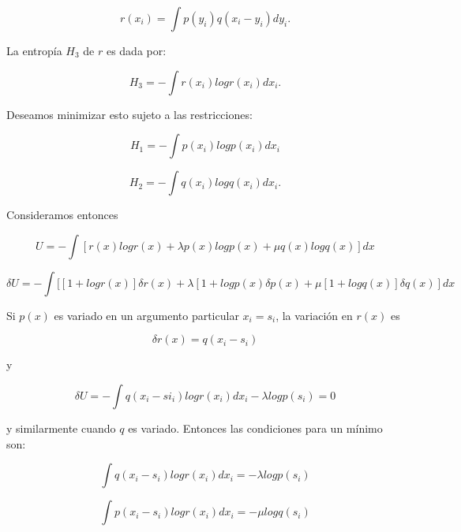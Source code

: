 \begin{equation} r(x_{i}) = \int p(y_{i}) q(x_{i} - y_{i}) dy_{i}.\end{equation}
			
La entrop\'ia $H_{3}$ de $r$ es dada por:

\begin{equation} H_{3} = - \int r(x_{i}) logr(x_{i}) dx_{i}. \end{equation}
			
Deseamos minimizar esto sujeto a las restricciones:

\begin{equation} H_{1} = - \int p(x_{i}) log p(x_{i}) dx_{i} \end{equation}
			
\begin{equation} H_{2} = - \int q(x_{i}) log q(x_{i}) dx_{i}. \end{equation}
				
Consideramos entonces
			
\begin{equation} U = - \int [r(x) logr(x) + \lambda p(x) log p(x) + \mu q(x) log q(x)]dx \end{equation}

\begin{equation} \delta U =  - \int  [[1 + logr(x)] \delta r(x) + \lambda [1 + logp(x) \delta p(x) + 
\mu [1 + logq(x)]\delta q(x)]dx \end{equation}

Si $p(x)$ es variado en un argumento particular $x_{i} = s_{i}$, la variaci\'on en $r(x)$ es

\begin{equation} \delta r(x) = q(x_{i} - s_{i}) \end{equation}
					
y

\begin{equation} \delta U = - \int q (x_{i} - si_{i}) log r(x_{i}) dx_{i} - \lambda log p(s_{i}) = 0 \end{equation}

y similarmente cuando $q$ es variado. Entonces las condiciones para un m\'inimo son:

\begin{equation} \int q(x_{i} - s_{i}) logr(x_{i}) dx_{i} = -\lambda log p(s_{i}) \end{equation}
				
\begin{equation} \int p(x_{i} - s_{i}) logr(x_{i}) dx_{i} = -\mu log q(s_{i}) \end{equation}
				

